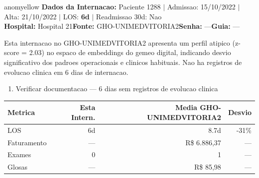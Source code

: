 \documentclass[a4paper,10pt]{article}
\begin{document}
\begin{anomalycard}[Internacao 1217 | GHO-UNIMEDVITORIA2 | MODERADO (z=2.03)]{anomyellow}
\textbf{Dados da Internacao:} Paciente 1288 $\mid$ Admissao: 15/10/2022 $\mid$ Alta: 21/10/2022 $\mid$ LOS: \textbf{6d} $\mid$ Readmissao 30d: Nao\\
\textbf{Hospital:} Hospital 21\quad\textbf{Fonte:} GHO-UNIMEDVITORIA2\quad\textbf{Senha:} ---\quad\textbf{Guia:} ---\\
\vspace{2pt}\begin{tcolorbox}[colback=severityred!20,colframe=anomyellow,title={\textbf{Interpretacao de Negocio}},fonttitle=\bfseries\small,left=4pt,right=4pt,top=3pt,bottom=3pt]
{\small Esta internacao no GHO-UNIMEDVITORIA2 apresenta um perfil atipico (z-score = 2.03) no espaco de embeddings do gemeo digital, indicando desvio significativo dos padroes operacionais e clinicos habituais. Nao ha registros de evolucao clinica em 6 dias de internacao.}
\end{tcolorbox}
\begin{tcolorbox}[colback=severityyellow!30,colframe=anomorange,title={\textbf{Recomendacoes Especificas}},fonttitle=\bfseries\small,left=4pt,right=4pt,top=3pt,bottom=3pt]
\begin{enumerate}[nosep,leftmargin=16pt]
\item {\small Verificar documentacao --- 6 dias sem registros de evolucao clinica}
\end{enumerate}
\end{tcolorbox}
\begin{center}\begin{tabular}{l r r r}\toprule\textbf{Metrica} & \textbf{Esta Intern.} & \textbf{Media GHO-UNIMEDVITORIA2} & \textbf{Desvio} \\\midrule
LOS & 6d & 8.7d & -31\% \\
Faturamento & --- & R\$ 6.886,37 & --- \\
Exames & 0 & 1 & --- \\
Glosas & --- & R\$ 85,98 & --- \\
\bottomrule\end{tabular}\end{center}


\end{anomalycard}
\end{document}
